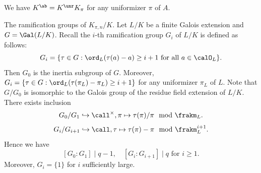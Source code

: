   \begin{theorem}
    We have $K^\ab = K^\unr K_\pi$ for any uniformizer $\pi$ of $A$.
  \end{theorem}

  The ramification groups of $K_{\pi,n}/K$.
  Let $L/K$ be a finite Galois extension and $G = \Gal(L/K)$.
  Recall the $i$-th ramification group $G_i$ of $L/K$ is defined as follows:
  \[ G_i = \{ \tau \in G : \ord_L(\tau(a) - a) \ge i + 1 \text{ for all } a \in \calO_L \}. \]
  Then $G_0$ is the inertia subgroup of $G$.
  Moreover, $G_i = \{ \tau \in G : \ord_L(\tau(\pi_L) - \pi_L) \ge i + 1 \}$ for any uniformizer $\pi_L$ of $L$.
  Note that $G/G_0$ is isomorphic to the Galois group of the residue field extension of $L/K$.
  There exists inclusion 
  \[ G_0/G_1 \hookrightarrow \call^\times, \pi \mapsto \tau(\pi)/\pi \mod \frakm_L. \]
  \[ G_i/G_{i+1} \hookrightarrow \call, \tau \mapsto \tau(\pi) - \pi \mod \frakm_L^{i+1}. \]
  Hence we have 
  \[ [G_0 : G_1] \mid q - 1, \quad [G_i : G_{i+1}] \mid q \text{ for } i \ge 1. \]
  Moreover, $G_i = \{ 1 \}$ for $i$ sufficiently large.
